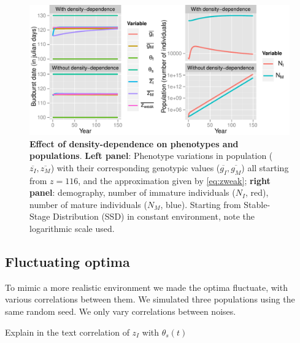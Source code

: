 \begin{figure}[ht!]
	\centering
	\includegraphics[scale=1]{Figures/DDphenopop.pdf}
	\caption{\textbf{Effect of density-dependence on phenotypes and populations}. \textbf{Left panel}: Phenotype variations in population ($\overline{z_I}, \overline{z_M}$) with their corresponding genotypic values ($\overline{g_I}, \overline{g_M}$) all starting from $z = 116$, and the approximation given by \autoref{eq:zweak}; \textbf{right panel}: demography, number of immature individuals ($N_I$, red), number of mature individuals ($N_M$, blue). Starting from Stable-Stage Distribution (SSD) in constant environment, note the logarithmic scale used.}
	\label{fig:dd}
\end{figure}

\subsection*{Fluctuating optima}

To mimic a more realistic environment we made the optima fluctuate, with various correlations between them. We simulated three populations using the same random seed. We only vary correlations between noises.

Explain in the text correlation of $z_{I}$ with $\theta_{s}(t)$

